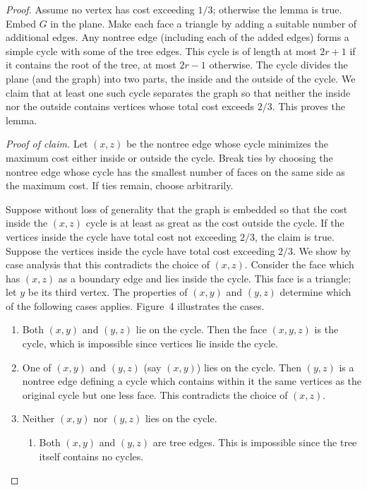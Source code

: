 \documentclass[12pt]{article}
\theoremstyle{remark}
\begin{document}
\begin{proof}
Assume no vertex has cost exceeding $1/3$; otherwise the lemma is true. Embed $G$
in the plane. Make each face a triangle by adding a suitable number of additional
edges. Any nontree edge (including each of the added edges) forms a simple cycle
with some of the tree edges. This cycle is of length at most $2r+1$ if it contains the
root of the tree, at most $2r-1$ otherwise. The cycle divides the plane (and the
graph) into two parts, the inside and the outside of the cycle. We claim that at least
one such cycle separates the graph so that neither the inside nor the outside contains
vertices whose total cost exceeds $2/3$. This proves the lemma.

\textit{Proof of claim.} Let $(x, z)$ be the nontree edge whose cycle minimizes the
maximum cost either inside or outside the cycle. Break ties by choosing the nontree
edge whose cycle has the smallest number of faces on the same side as the maximum
cost. If ties remain, choose arbitrarily.

Suppose without loss of generality that the graph is embedded so that the cost
inside the $(x, z)$ cycle is at least as great as the cost outside the cycle. If the
vertices inside the cycle have total cost not exceeding $2/3$, the claim is true.
Suppose the vertices inside the cycle have total cost exceeding $2/3$. We show by
case analysis that this contradicts the choice of $(x, z)$. Consider the face which
has $(x, z)$ as a boundary edge and lies inside the cycle. This face is a triangle;
let $y$ be its third vertex. The properties of $(x, y)$ and $(y, z)$ determine which
of the following cases applies. Figure~4 illustrates the cases.

\begin{enumerate}[label=\arabic*)]
\item Both $(x, y)$ and $(y, z)$ lie on the cycle. Then the face $(x, y, z)$ is the
cycle, which is impossible since vertices lie inside the cycle.

\item One of $(x, y)$ and $(y, z)$ (say $(x, y)$) lies on the cycle. Then $(y, z)$
is a nontree edge defining a cycle which contains within it the same vertices as the
original cycle but one less face. This contradicts the choice of $(x, z)$.

\item Neither $(x, y)$ nor $(y, z)$ lies on the cycle.
  \begin{enumerate}[label=\alph*)]
  \item Both $(x, y)$ and $(y, z)$ are tree edges. This is impossible since the tree
  itself contains no cycles.


\end{enumerate}
\end{enumerate}
\end{proof}
\end{document}

